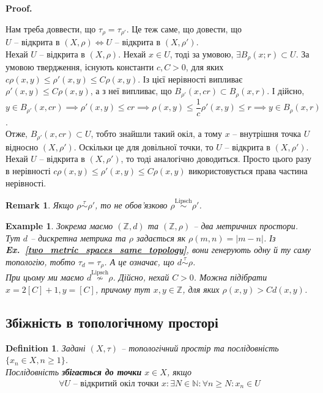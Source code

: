 \documentclass[a4paper, 10pt]{article}
\makeatletter
\theoremstyle{theoremdd}
\newtheorem{definition}[theorem]{Definition}
\newtheorem{example}[theorem]{Example}
\newtheorem{remark}[theorem]{Remark}
\newcommand\exref[1]{\textbf{Ex.~\ref{#1}}}
\renewenvironment{proof}[1][Proof.\\]{\par
\pushQED{\hfill \qed}%
\normalfont \topsep6\p@\@plus6\p@\relax
\trivlist
\item\relax
{\bfseries
#1\@addpunct{.}}\hspace\labelsep\ignorespaces
}{%
\popQED\endtrivlist\@endpefalse
}
\makeatother
\begin{document}
\begin{proof}
Нам треба доввести, що $\tau_\rho = \tau_{\rho'}$. Це теж саме, що довести, що\\ $U$ -- відкрита в $(X,\rho) \iff U$ -- відкрита в $(X,\rho')$.\\
Нехай $U$ -- відкрита в $(X,\rho)$. Нехай $x \in U$, тоді за умовою, $\exists B_\rho(x;r) \subset U$. За умовою твердження, існують константи $c,C >0$, для яких $c \rho(x,y) \leq \rho'(x,y) \leq C \rho (x,y)$. Із цієї нерівності випливає $\rho'(x,y) \leq C \rho(x,y)$, а з неї випливає, що $B_{\rho'}(x, c r) \subset B_{\rho}(x,r)$. І дійсно,\\
$y \in B_{\rho'}(x,cr) \implies \rho'(x,y) \leq cr \implies \rho(x,y) \leq \dfrac{1}{c} \rho'(x,y) \leq r \implies y \in B_{\rho}(x,r)$.\\
Отже, $B_{\rho'}(x,cr) \subset U$, тобто знайшли такий окіл, а тому $x$ -- внутрішня точка $U$ відносно $(X,\rho')$. Оскільки це для довільної точки, то $U$ -- відкрита в $(X,\rho')$.\\
Нехай $U$ -- відкрита в $(X,\rho')$, то тоді аналогічно доводиться. Просто цього разу в нерівності $c \rho(x,y) \leq \rho'(x,y) \leq C \rho(x,y)$ використовується права частина нерівності.
\end{proof}

\begin{remark}
Якщо $\rho \overset{\tau}{\sim} \rho'$, то не обов'язково $\rho \overset{\text{Lipsch}}{\sim} \rho'$.
\end{remark}

\begin{example}
Зокрема маємо $(\mathbb{Z},d)$ та $(\mathbb{Z},\rho)$ -- два метричних простори. Тут $d$ -- дискретна метрика та $\rho$ задається як $\rho(m,n) = |m-n|$. Із \exref{two_metric_spaces_same_topology}, вони генерують одну й ту саму топологію, тобто $\tau_d = \tau_\rho$. А це означає, що $d \overset{\tau}{\sim} \rho$.\\
При цьому ми маємо $d \overset{\text{Lipsch}}{\not\sim} \rho$. Дійсно, нехай $C > 0$. Можна підібрати $x = 2 [C] + 1,y = [C]$, причому тут $x,y \in \mathbb{Z}$, для яких $\rho(x,y) > C d(x,y)$.
\end{example}

\subsection{Збіжність в топологічному просторі}
\begin{definition}
Задані $(X,\tau)$ -- топологічний простір та послідовність $\{x_n \in X, n \geq 1\}$.\\
Послідовність \textbf{збігається до точки} $x \in X$, якщо
\begin{align*}
\forall U \text{ -- відкритий окіл точки } x: \exists N \in \mathbb{N}: \forall n \geq N: x_n \in U
\end{align*}
\end{definition}
\end{document}
